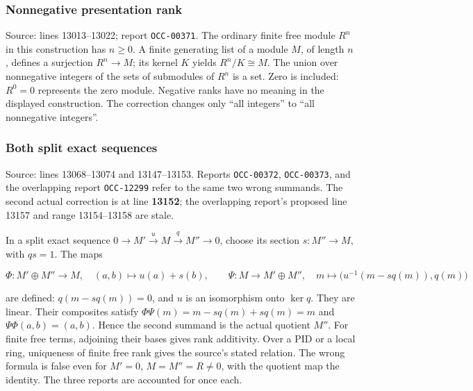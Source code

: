 \subsubsection{Nonnegative presentation rank}\label{algebra-proof-001-nonnegative-presentation-rank}

Source: lines 13013--13022; report \texttt{OCC-00371}. The ordinary finite free module \(R^n\) in this construction has \(n\geq0\). A finite generating list of a module \(M\), of length \(n\), defines a surjection \(R^n\to M\); its kernel \(K\) yields \(R^n/K\cong M\). The union over nonnegative integers of the sets of submodules of \(R^n\) is a set. Zero is included: \(R^0=0\) represents the zero module. Negative ranks have no meaning in the displayed construction. The correction changes only ``all integers'' to ``all nonnegative integers''.

\subsubsection{Both split exact sequences}\label{algebra-proof-001-both-split-exact-sequences}

Source: lines 13068--13074 and 13147--13153. Reports \texttt{OCC-00372}, \texttt{OCC-00373}, and the overlapping report \texttt{OCC-12299} refer to the same two wrong summands. The second actual correction is at line \textbf{13152}; the overlapping report's proposed line 13157 and range 13154--13158 are stale.

In a split exact sequence \(0\to M'\xrightarrow{u}M\xrightarrow{q}M''\to0\), choose its section \(s:M''\to M\), with \(qs=1\). The maps

\[
\Phi:M'\oplus M''\to M,\quad (a,b)\mapsto u(a)+s(b),
\qquad
\Psi:M\to M'\oplus M'',\quad
m\mapsto\bigl(u^{-1}(m-sq(m)),q(m)\bigr)
\]

are defined: \(q(m-sq(m))=0\), and \(u\) is an isomorphism onto \(\ker q\). They are linear. Their composites satisfy \(\Phi\Psi(m)=m-sq(m)+sq(m)=m\) and \(\Psi\Phi(a,b)=(a,b)\). Hence the second summand is the actual quotient \(M''\). For finite free terms, adjoining their bases gives rank additivity. Over a PID or a local ring, uniqueness of finite free rank gives the source's stated relation. The wrong formula is false even for \(M'=0\), \(M=M''=R\ne0\), with the quotient map the identity. The three reports are accounted for once each.

